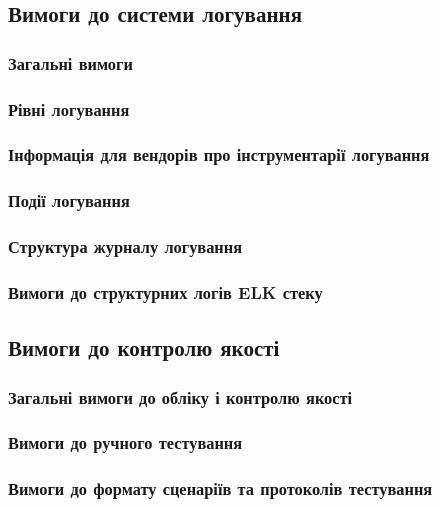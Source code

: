 \subsection{Вимоги до системи логування}

\subsubsection{Загальні вимоги}

\subsubsection{Рівні логування}

\subsubsection{Інформація для вендорів про інструментарії логування}

\subsubsection{Події логування}

\subsubsection{Структура журналу логування}

\subsubsection{Вимоги до структурних логів ELK стеку}

\newpage
\subsection{Вимоги до контролю якості}

\subsubsection{Загальні вимоги до обліку і контролю якості}

\subsubsection{Вимоги до ручного тестування}

\subsubsection{Вимоги до формату сценаріїв та протоколів тестування}

